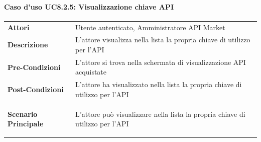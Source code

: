 \paragraph{Caso d'uso UC8.2.5: Visualizzazione chiave API}
\label{UC8_2_5}

\begin{minipage}{\linewidth}
	\begin{tabular}{ l | p{11cm}}
		\hline
		\rowcolor{Gray}
		\multicolumn{2}{c}{UC8.2.5 - Visualizzazione chiave API} \\
		\hline
		\textbf{Attori} & Utente autenticato, Amministratore API Market \\
		\textbf{Descrizione} & L'attore visualizza nella lista la propria chiave di utilizzo per l'API \\
		\textbf{Pre-Condizioni} & L'attore si trova nella schermata di visualizzazione API acquistate \\
		\textbf{Post-Condizioni} & L'attore ha visualizzato nella lista la propria chiave di utilizzo per l'API \\
		\textbf{Scenario Principale} & 
		\begin{enumerate*}[label=(\arabic*.),itemjoin={\newline}]
			\item L'attore può visualizzare nella lista la propria chiave di utilizzo per l'API
		\end{enumerate*}\\
	\end{tabular}
\end{minipage}